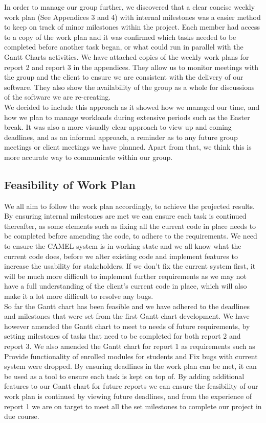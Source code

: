 In order to manage our group further, we discovered that a clear concise weekly work plan (See Appendices 3 and 4) with internal milestones was a easier method to keep on track of minor milestones within the project. Each member had access to a copy of the work plan and it was confirmed which tasks needed to be completed before another task began, or what could run in parallel with the Gantt Charts activities. We have attached copies of the weekly work plans for report 2 and report 3 in the appendices. They allow us to monitor meetings with the group and the client to ensure we are consistent with the delivery of our software. They also show the availability of the group as a whole for discussions of the software we are re-creating. \\

We decided to include this approach as it showed how we managed our time, and how we plan to manage workloads during extensive periods such as the Easter break. It was also a more visually clear approach to view up and coming deadlines, and as an informal approach, a reminder as to any future  group meetings or client meetings we have planned. Apart from that, we think this is more accurate way  to communicate within our group. \\

\subsection*{Feasibility of Work Plan}

We all aim to follow the work plan accordingly, to achieve the projected results. By ensuring internal milestones are met we can ensure each task is continued thereafter, as some elements such as fixing all the current code in place needs to be completed before amending the code, to adhere to the requirements. We need to ensure the CAMEL system is in working state and we all know what the current code does, before we alter existing code and implement features to increase the usability for stakeholders. If we don’t fix the current system first, it will be much more difficult to implement further requirements as we may not have a full understanding of the client's current code in place, which will also make it a lot more difficult to resolve any bugs. \\

So far the Gantt chart has been feasible and we have adhered to the deadlines and milestones that were set from the first Gantt chart development. We have however amended the Gantt chart to meet to needs of future requirements, by setting milestones of tasks that need to be completed for both report 2 and report 3. We also amended the Gantt chart for report 1 as requirements such as Provide functionality of enrolled modules for students and Fix bugs with current system were dropped. By ensuring deadlines in the work plan can be met, it can be used as a tool to ensure each task is kept on top of. By adding additional features to our Gantt chart for future reports we can ensure the feasibility of our work plan is continued by viewing future deadlines, and from the experience of report 1 we are on target to meet all the set milestones to complete our project in due course. \\

